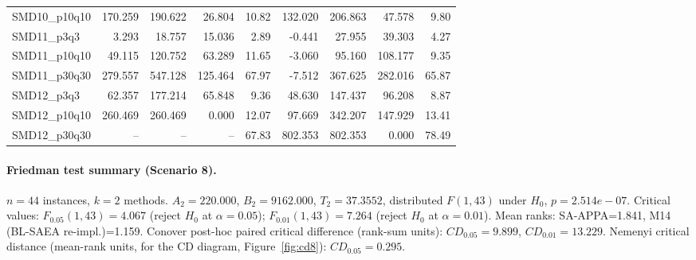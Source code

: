 \begin{longtable}{lrrrrrrrr}
SMD10\_p10q10 & 170.259 & 190.622 & 26.804 & 10.82 & 132.020 & 206.863 & 47.578 & 9.80 \\
SMD11\_p3q3 & 3.293 & 18.757 & 15.036 & 2.89 & -0.441 & 27.955 & 39.303 & 4.27 \\
SMD11\_p10q10 & 49.115 & 120.752 & 63.289 & 11.65 & -3.060 & 95.160 & 108.177 & 9.35 \\
SMD11\_p30q30 & 279.557 & 547.128 & 125.464 & 67.97 & -7.512 & 367.625 & 282.016 & 65.87 \\
SMD12\_p3q3 & 62.357 & 177.214 & 65.848 & 9.36 & 48.630 & 147.437 & 96.208 & 8.87 \\
SMD12\_p10q10 & 260.469 & 260.469 & 0.000 & 12.07 & 97.669 & 342.207 & 147.929 & 13.41 \\
SMD12\_p30q30 & -- & -- & -- & 67.83 & 802.353 & 802.353 & 0.000 & 78.49 \\
\end{longtable}
\endgroup

\paragraph{Friedman test summary (Scenario 8).}
$n=44$ instances, $k=2$ methods. $A_2=220.000$, $B_2=9162.000$, $T_2=37.3552$, distributed $F(1,43)$ under $H_0$, $p=2.514e-07$. Critical values: $F_{0.05}(1,43)=4.067$ (reject $H_0$ at $\alpha=0.05$); $F_{0.01}(1,43)=7.264$ (reject $H_0$ at $\alpha=0.01$). Mean ranks: SA-APPA=1.841, M14 (BL-SAEA re-impl.)=1.159. Conover post-hoc paired critical difference (rank-sum units): $CD_{0.05}=9.899$, $CD_{0.01}=13.229$. Nemenyi critical distance (mean-rank units, for the CD diagram, Figure~\ref{fig:cd8}): $CD_{0.05}=0.295$.
